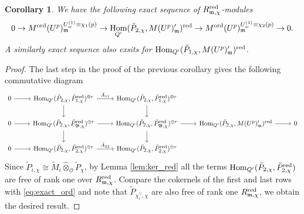 \documentclass[leqno]{amsart}
\newtheorem{cor}[thm]{Corollary}
\theoremstyle{definition}
\theoremstyle{remark}
\newcommand{\oo}{\mathcal{O}}
\DeclareMathOperator{\Hom}{Hom}
\newcommand{\fm}{\mathfrak{m}}
\newcommand{\B}{\mathfrak B} %
\newcommand{\red}{\textnormal{red}}
\newcommand{\ord}{\textnormal{ord}} %
\begin{document}
\begin{cor}\label{cor:fil_by_ord}
	We have the following exact sequence of
	$R_{\fm,\chi}^{\red}$-modules
\begin{equation}
	0\to M^{\ord}(U^p)_{\fm}^{U_{w}^{(1)}\equiv \chi_1(p)}\to
	\Hom_{Q'}(\tilde{P}_{2,\chi},M(U^p)_{\fm}')^{\red}\to
	M^{\ord}(U^p)_{\fm}^{U_{w}^{(1)}\equiv \chi_2(p)}\to0.
\end{equation}
A similarly exact sequence also exsits
for $\Hom_{Q'}(\tilde{P}_{1,\chi},M(U^p)_{\fm}')^{\red}$.
\end{cor}
\begin{proof}
	The last step in the proof of the previous corollary
	gives the following commutative diagram
\begin{equation*}
    \begin{tikzcd}
	    0 \arrow[r]& 
	    \Hom_{Q'}(\tilde{P}_{2,\chi},\tilde{P}_{1,\chi}^{\red})^{\oplus r}
	    \arrow[r,"\bar{A}_{11}"] \arrow[d]&
	    \Hom_{Q'}(\tilde{P}_{2,\chi}, \tilde{P}_{1,\chi}^{\red})^{\oplus r}
	    \arrow[d] &&\\
	    0\arrow[r] & 
	    \Hom_{Q'}(\tilde{P}_{2,\chi},\tilde{P}_{\B,\chi}^{\red})^{\oplus r}
	    \arrow[r] \arrow[d] &
	    \Hom_{Q'}(\tilde{P}_{2,\chi}, \tilde{P}_{\B,\chi}^{\red})^{\oplus r}
	    \arrow[d] \arrow[r]&
	    \Hom_{Q'}(\tilde{P}_{2,\chi}, M(U^p)_{\fm}')^{\red}\arrow[r]&0\\
	    0\arrow[r] & 
	    \Hom_{Q'}(\tilde{P}_{2,\chi}, \tilde{P}_{2,\chi}^{\red})^{\oplus r}
	    \arrow[r,"\bar{A}_{22}"] &
	    \Hom_{Q'}(\tilde{P}_{2,\chi},\tilde{P}_{2,\chi}^{\red})^{\oplus r}&&
    \end{tikzcd}
\end{equation*}
Since $\tilde{P}_{i,\chi}\cong \tilde{M}_i\hat{\otimes}_{\oo}\tilde{P}_{\chi}$,
by Lemma \ref{lem:ker_red}
all the terms 
$\Hom_{Q'}(\tilde{P}_{2,\chi},\tilde{P}_{2,\chi}^{\red})$
are free of rank one over  $R_{\fm,\chi}^{\red}$.
Compare the cokernels of the first and last rows
with \eqref{eq:exact_ord}
and note that $\tilde{P}_{\chi_i^\vee,\chi}$
are also free of rank one $R_{\fm,\chi}^{\red}$,
we obtain the desired result.
\end{proof}  
\end{document}
